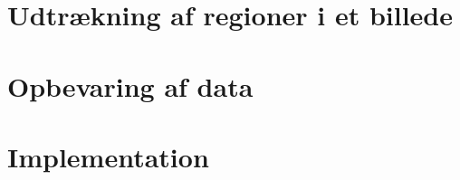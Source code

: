 {\section{Udtrækning af regioner i et billede\label{section_udtraek}}


\section{Opbevaring af data\label{section_database}}


\section{Implementation}


}

